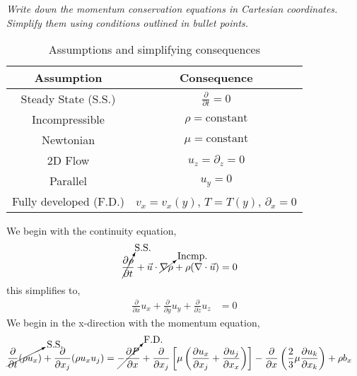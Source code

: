 
\section{}
\textit{Write down the momentum conservation equations in Cartesian coordinates. Simplify them using conditions outlined in bullet points.}

\begin{table}[h]
    \centering
    \caption{Assumptions and simplifying consequences}
    \begin{tabular}{cc}
        \hline
        \textbf{Assumption} & \textbf{Consequence} \\
        \hline
        Steady State (S.S.) & $\frac{\partial}{\partial t} = 0$ \\
        Incompressible & $\rho = \text{constant}$ \\
        Newtonian & $\mu = \text{constant}$ \\
        2D Flow & $u_z = \partial_{z} = 0$ \\
        Parallel & $u_y = 0$ \\
        Fully developed (F.D.) & $v_x = v_x(y)$, $T = T(y)$, $\partial_{x} = 0$ \\
        \hline
    \end{tabular}
    \label{tab:assumptions}
\end{table}
\FloatBarrier
We begin with the continuity equation,
\begin{align*}
    \cancelto{\text{S.S.}}{\frac{\partial \rho}{\partial t}} + \vec{u} \cdot \cancelto{\text{Incmp.}}{ \nabla \rho} +\rho (\nabla \cdot \vec{u}) &= 0
\end{align*}
this simplifies to,
\begin{align*}
    \frac{\partial}{\partial x} u_x + \frac{\partial}{\partial y} u_y + \frac{\partial}{\partial z} u_z &= 0 
\end{align*}
We begin in the x-direction with the momentum equation,
\begin{align*}
    \cancelto{\text{S.S.}}{\frac{\partial}{\partial t} (\rho u_x)} + \frac{\partial}{\partial x_j} (\rho u_x u_j) &= \cancelto{\text{F.D.}}{-\frac{\partial P}{\partial x}} + \frac{\partial}{\partial x_j} \left[ \mu \left( \frac{\partial u_x}{\partial x_j} + \frac{\partial u_j}{\partial x_x} \right) \right] - \frac{\partial}{\partial x} \left(\frac{2}{3} \mu \frac{\partial u_k}{\partial x_k} \right) + \rho b_x
\end{align*}
